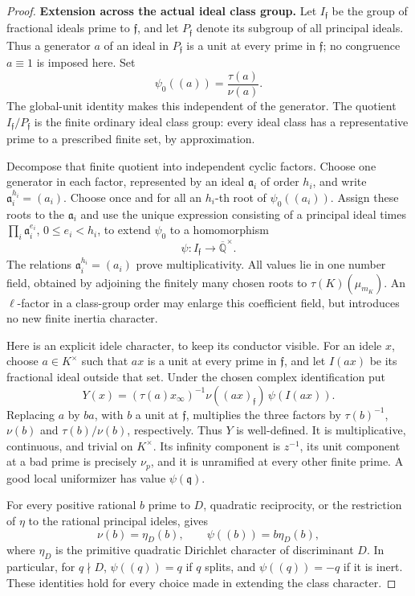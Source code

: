 \begin{proof}
\par\medskip\noindent\textbf{Extension across the actual ideal class group.}
Let $I_{\mathfrak f}$ be the group of fractional ideals prime to
$\mathfrak f$, and let $P_{\mathfrak f}$ denote its subgroup of
all principal ideals.  Thus a generator $a$ of an ideal in
$P_{\mathfrak f}$ is a unit at every prime in $\mathfrak f$;
no congruence $a\equiv1$ is imposed here.  Set
\[
             \psi_0((a))=\frac{\tau(a)}{\nu(a)}.
\]
The global-unit identity makes this independent of the generator.
The quotient $I_{\mathfrak f}/P_{\mathfrak f}$ is the finite
ordinary ideal class group: every ideal class has a representative
prime to a prescribed finite set, by approximation.

Decompose that finite quotient into independent cyclic factors.
Choose one generator in each factor, represented by an ideal
$\mathfrak a_i$ of order $h_i$, and write
$\mathfrak a_i^{h_i}=(a_i)$.  Choose once and for all an
$h_i$-th root of $\psi_0((a_i))$.  Assign these roots to the
$\mathfrak a_i$ and use the unique expression consisting of a
principal ideal times $\prod_i\mathfrak a_i^{e_i}$,
$0\le e_i<h_i$, to extend $\psi_0$ to a homomorphism
\[
                  \psi:I_{\mathfrak f}\longrightarrow
                                      \overline{\mathbb Q}^{\times}.
\]
The relations $\mathfrak a_i^{h_i}=(a_i)$ prove multiplicativity.
All values lie in one number field, obtained by adjoining the
finitely many chosen roots to $\tau(K)(\mu_{m_K})$.
An $\ell$-factor in a class-group order may enlarge this coefficient
field, but introduces no new finite inertia character.

Here is an explicit idele character, to keep its conductor visible.
For an idele $x$, choose $a\in K^\times$ such that $ax$ is a unit
at every prime in $\mathfrak f$, and let $I(ax)$ be its fractional
ideal outside that set.  Under the chosen complex identification put
\[
             Y(x)=(\tau(a)x_\infty)^{-1}
                         \nu((ax)_{\mathfrak f})\,\psi(I(ax)).
\]
Replacing $a$ by $ba$, with $b$ a unit at $\mathfrak f$,
multiplies the three factors by $\tau(b)^{-1}$, $\nu(b)$ and
$\tau(b)/\nu(b)$, respectively.  Thus $Y$ is well-defined.
It is multiplicative, continuous, and trivial on $K^\times$.
Its infinity component is $z^{-1}$, its unit component at a
bad prime is precisely $\nu_p$, and it is unramified at every
other finite prime.  A good local uniformizer has value
$\psi(\mathfrak q)$.

For every positive rational $b$ prime to $D$, quadratic reciprocity,
or the restriction of $\eta$ to the rational principal ideles, gives
\[
                \nu(b)=\eta_D(b),\qquad
                \psi((b))=b\eta_D(b),                 \tag{*}
\]
where $\eta_D$ is the primitive quadratic Dirichlet character of
discriminant $D$.  In particular, for $q\nmid D$,
$\psi((q))=q$ if $q$ splits, and $\psi((q))=-q$ if it is inert.
These identities hold for every choice made in extending the class
character.


\end{proof}
